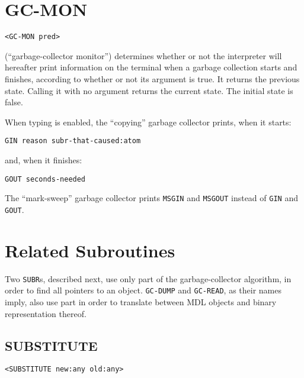 \documentclass[a4paper]{scrbook}
\begin{document}
\section{GC-MON}\label{gc-mon}

\begin{verbatim}
<GC-MON pred>
\end{verbatim}

 (``garbage-collector monitor'') determines whether or not the interpreter will hereafter
print information on the terminal when a garbage collection starts and finishes, according to whether or not its argument
is true. It returns the previous state. Calling it with no argument returns the current state. The initial state is false.

When typing is enabled, the ``copying'' garbage collector prints, when it starts:

\begin{verbatim}
GIN reason subr-that-caused:atom
\end{verbatim}

and, when it finishes:

\begin{verbatim}
GOUT seconds-needed
\end{verbatim}

The ``mark-sweep'' garbage collector prints \texttt{MSGIN} and \texttt{MSGOUT} instead of \texttt{GIN} and \texttt{GOUT}.

\section{Related Subroutines}\label{related-subroutines}

Two \texttt{SUBR}s, described next, use only part of the garbage-collector algorithm, in order to find all pointers to an
object. \texttt{GC-DUMP} and \texttt{GC-READ}, as their names imply, also
use part in order to translate between MDL objects and binary representation thereof.

\subsection{SUBSTITUTE}\label{substitute}

\begin{verbatim}
<SUBSTITUTE new:any old:any>
\end{verbatim}
\end{document}
